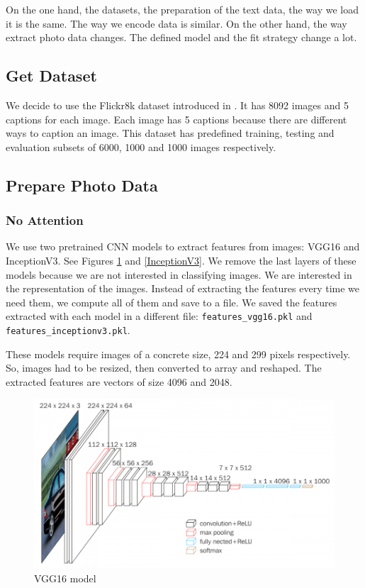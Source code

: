 \documentclass{article} %
\begin{document}
On the one hand, the datasets, the preparation of the text data, the way we load it is the same. The way we encode data is similar. On the other hand, the way extract photo data changes. The defined model and the fit strategy change a lot.

\subsection{Get Dataset}

We decide to use the Flickr8k dataset introduced in \cite{Flickr8k}. It has 8092 images and 5 captions for each image. Each image has 5 captions because there are different ways to caption an image. This dataset has predefined training, testing and evaluation subsets of 6000, 1000 and 1000 images respectively.

\subsection{Prepare Photo Data}

\subsubsection{No Attention}
We use two pretrained CNN models to extract features from images: VGG16 and InceptionV3. See Figures \ref{VGG16} and \ref{InceptionV3}. We remove the last layers of these models because we are not interested in classifying images. We are interested in the representation of the images.
Instead of extracting the features every time we need them, we compute all of them and save to a file. We saved the features extracted with each model in a different file: \texttt{features\_vgg16.pkl} and \texttt{features\_inceptionv3.pkl}.

These models require images of a concrete size, 224 and 299 pixels respectively. So, images had to be resized, then converted to array and reshaped. The extracted features are vectors of size 4096 and 2048.

\begin{figure}[ht]
\centering
\includegraphics[width=\textwidth]{vgg16.png}
\caption{VGG16 model} 
\label{VGG16}
\end{figure}
\end{document}

